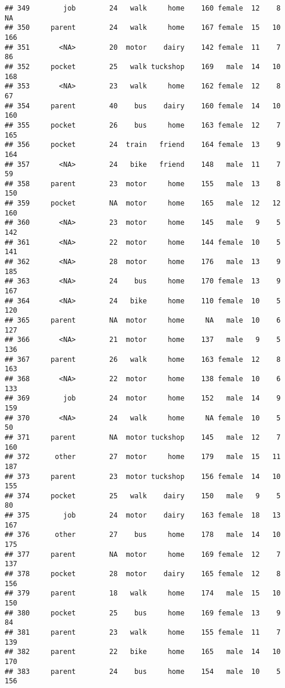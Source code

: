 \documentclass[
]{article}
\begin{document}
\begin{verbatim}
## 349        job        24   walk     home    160 female  12    8      NA
## 350     parent        24   walk     home    167 female  15   10     166
## 351       <NA>        20  motor    dairy    142 female  11    7      86
## 352     pocket        25   walk tuckshop    169   male  14   10     168
## 353       <NA>        23   walk     home    162 female  12    8      67
## 354     parent        40    bus    dairy    160 female  14   10     160
## 355     pocket        26    bus     home    163 female  12    7     165
## 356     pocket        24  train   friend    164 female  13    9     164
## 357       <NA>        24   bike   friend    148   male  11    7      59
## 358     parent        23  motor     home    155   male  13    8     150
## 359     pocket        NA  motor     home    165   male  12   12     160
## 360       <NA>        23  motor     home    145   male   9    5     142
## 361       <NA>        22  motor     home    144 female  10    5     141
## 362       <NA>        28  motor     home    176   male  13    9     185
## 363       <NA>        24    bus     home    170 female  13    9     167
## 364       <NA>        24   bike     home    110 female  10    5     120
## 365     parent        NA  motor     home     NA   male  10    6     127
## 366       <NA>        21  motor     home    137   male   9    5     136
## 367     parent        26   walk     home    163 female  12    8     163
## 368       <NA>        22  motor     home    138 female  10    6     133
## 369        job        24  motor     home    152   male  14    9     159
## 370       <NA>        24   walk     home     NA female  10    5      50
## 371     parent        NA  motor tuckshop    145   male  12    7     160
## 372      other        27  motor     home    179   male  15   11     187
## 373     parent        23  motor tuckshop    156 female  14   10     155
## 374     pocket        25   walk    dairy    150   male   9    5      80
## 375        job        24  motor    dairy    163 female  18   13     167
## 376      other        27    bus     home    178   male  14   10     175
## 377     parent        NA  motor     home    169 female  12    7     137
## 378     pocket        28  motor    dairy    165 female  12    8     156
## 379     parent        18   walk     home    174   male  15   10     150
## 380     pocket        25    bus     home    169 female  13    9      84
## 381     parent        23   walk     home    155 female  11    7     139
## 382     parent        22   bike     home    165   male  14   10     170
## 383     parent        24    bus     home    154   male  10    5     156

\end{verbatim}
\end{document}
